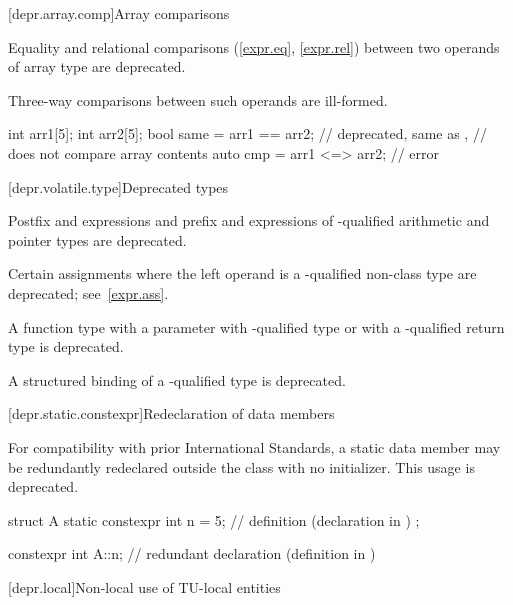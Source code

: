 [depr.array.comp]{Array comparisons}

\pnum
Equality and relational comparisons (\ref{expr.eq}, \ref{expr.rel})
between two operands of array type
are deprecated.
\begin{note}
Three-way comparisons between such operands are ill-formed.
\end{note}
\begin{example}
\begin{codeblock}
int arr1[5];
int arr2[5];
bool same = arr1 == arr2;       // deprecated, same as ,
                                // does not compare array contents
auto cmp = arr1 <=> arr2;       // error
\end{codeblock}
\end{example}

[depr.volatile.type]{Deprecated  types}

\pnum
Postfix \tcode{++} and \tcode{\dcr} expressions and
prefix \tcode{++} and \tcode{\dcr} expressions
of -qualified arithmetic and pointer types are deprecated.

\pnum
Certain assignments
where the left operand is a -qualified non-class type
are deprecated; see~\ref{expr.ass}.

\pnum
A function type
with a parameter with -qualified type or
with a -qualified return type is deprecated.

\pnum
A structured binding of a -qualified type
is deprecated.

[depr.static.constexpr]{Redeclaration of  data members}

\pnum
For compatibility with prior \Cpp{} International Standards, a 
static data member may be redundantly redeclared outside the class with no initializer.
This usage is deprecated.
\begin{example}
\begin{codeblock}
struct A {
  static constexpr int n = 5;   // definition (declaration in \CppXIV{})
};

constexpr int A::n;             // redundant declaration (definition in \CppXIV{})
\end{codeblock}
\end{example}

[depr.local]{Non-local use of TU-local entities}

